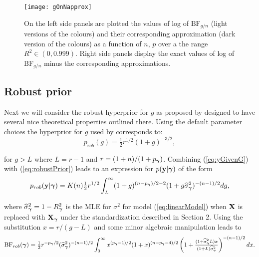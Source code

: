 \begin{figure}
	\centering
	\texttt{[image: gOnNapprox]}
	\caption{On the left side panels are plotted the values of log of $\mbox{BF}_{g/n}$ (light versions of the
		colours) and their corresponding approximation (dark version of the colours) 
		as a function of $n$, $p$ over a the range $R^2\in(0,0.999)$. Right side panels display
		the exact values of log of $\mbox{BF}_{g/n}$ minus the corresponding approximations.}
	\label{fig:gonnapprox}
\end{figure}


\subsection{Robust prior}  

\noindent Next we will consider the robust hyperprior for $g$ as proposed by
\cite{Bayarri2012} designed to have several nice theoretical properties
outlined there. Using the default parameter choices the hyperprior for $g$ used
by \cite{Bayarri2012} corresponds to:
\begin{equation}\label{eq:robustPrior}
	p_{{rob}}(g) = \tfrac{1}{2}r^{1/2} (1 + g)^{-3/2},
\end{equation}

\noindent for $g>L$  where $L = r - 1$ and $r = (1 + n)/(1 + p_{\boldsymbol \gamma})$.
Combining (\ref{eq:yGivenG}) with (\ref{eq:robustPrior}) leads to an expression
for $p({\bf y}|{\boldsymbol \gamma})$ of the form
\begin{equation}\label{eq:marginalLikelihoodRobust}
	\displaystyle p_{rob}({\bf y}|{\boldsymbol \gamma})
	\displaystyle = K(n) \tfrac{1}{2} r^{1/2} 
	\int_L^\infty  (1 + g)^{(n - p_{\boldsymbol \gamma})/2 - 2}(  1 + g \widehat{\sigma}_{\boldsymbol \gamma}^2)^{-(n-1)/2} dg,
\end{equation}

\noindent where $\widehat{\sigma}_{\boldsymbol \gamma}^2 = 1 - R_{\boldsymbol \gamma}^2$ is the MLE for
$\sigma^2$ for model (\ref{eq:linearModel}) when ${\bf X}$ is replaced with
${\bf X}_{\boldsymbol \gamma}$ under the standardization described in Section 2.  Using the
substitution $x = r/(g - L)$ and some minor algebraic manipulation leads to
%
$$
\displaystyle \mbox{BF}_{{rob}}({\boldsymbol \gamma})
\displaystyle = \tfrac{1}{2} r^{ - p_{\boldsymbol \gamma}/2} (\widehat{\sigma}_{\boldsymbol \gamma}^2)^{-(n-1)/2}
\int_0^\infty x^{(p_{\boldsymbol \gamma}-1)/2} 
(1 + x)^{(n - p_{\boldsymbol \gamma} - 4)/2}
\left( 1 + \tfrac{(1 + \widehat{\sigma}_{\boldsymbol \gamma}^2 L)x}{(1 + L)\widehat{\sigma}_{\boldsymbol \gamma}^2}  \right)^{-(n-1)/2}  dx.
$$



